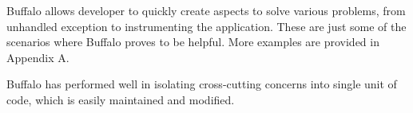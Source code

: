 Buffalo allows developer to quickly create aspects to solve various problems, from unhandled exception to instrumenting the application. These are just some of the scenarios where Buffalo proves to be helpful. More examples are provided in Appendix A. 

Buffalo has performed well in isolating cross-cutting concerns into single unit of code, which is easily maintained and modified.
